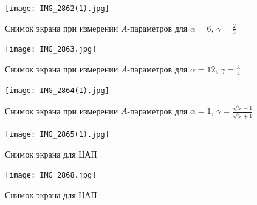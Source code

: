 \documentclass[a4paper, 12pt]{article}
\begin{document}
\begin{figure}
  \centering
  \texttt{[image: IMG\_2862(1).jpg]}
  \caption{Снимок экрана при измерении $A$-параметров для $\alpha = 6$, $\gamma = \frac{2}{3}$}
\end{figure}

\begin{figure}
  \centering
  \texttt{[image: IMG\_2863.jpg]}
  \caption{Снимок экрана при измерении $A$-параметров для $\alpha = 12$, $\gamma = \frac{3}{4}$}
\end{figure}

\begin{figure}
  \centering
  \texttt{[image: IMG\_2864(1).jpg]}
  \caption{Снимок экрана при измерении $A$-параметров для $\alpha = 1$, $\gamma = \frac{\sqrt{5} - 1}{\sqrt{5} + 1}$}
\end{figure}

\begin{figure}
  \centering
  \texttt{[image: IMG\_2865(1).jpg]}
  \caption{Снимок экрана для ЦАП}
\end{figure}

\begin{figure}
  \centering
  \texttt{[image: IMG\_2868.jpg]}
  \caption{Снимок экрана для ЦАП}
\end{figure}
\end{document}
